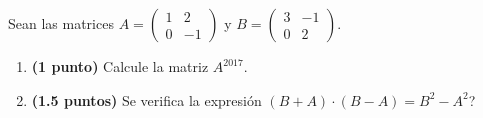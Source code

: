 
Sean las matrices $A=\begin{pmatrix}1&2\\0&-1\end{pmatrix}$ y $B=\begin{pmatrix}3&-1\\0&2\end{pmatrix}$.
\begin{enumerate}[label=\alph*)]
\item \textbf{(1 punto)} Calcule la matriz $A^{2017}$.
\item \textbf{(1.5 puntos)} \textquestiondown{}Se verifica la expresión $(B+A)\cdot(B-A)=B^2-A^2$?
\end{enumerate}

